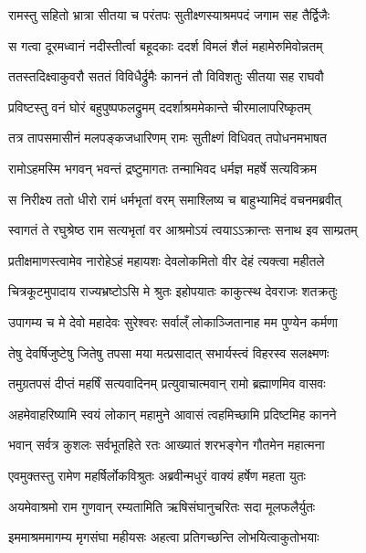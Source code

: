 
\twolineshloka
{रामस्तु सहितो भ्रात्रा सीतया च परंतपः}
{सुतीक्ष्णस्याश्रमपदं जगाम सह तैर्द्विजैः} %

\twolineshloka
{स गत्वा दूरमध्वानं नदीस्तीर्त्वा बहूदकाः}
{ददर्श विमलं शैलं महामेरुमिवोन्नतम्} %

\twolineshloka
{ततस्तदिक्ष्वाकुवरौ सततं विविधैर्द्रुमैः}
{काननं तौ विविशतुः सीतया सह राघवौ} %

\twolineshloka
{प्रविष्टस्तु वनं घोरं बहुपुष्पफलद्रुमम्}
{ददर्शाश्रममेकान्ते चीरमालापरिष्कृतम्} %

\twolineshloka
{तत्र तापसमासीनं मलपङ्कजधारिणम्}
{रामः सुतीक्ष्णं विधिवत् तपोधनमभाषत} %

\twolineshloka
{रामोऽहमस्मि भगवन् भवन्तं द्रष्टुमागतः}
{तन्माभिवद धर्मज्ञ महर्षे सत्यविक्रम} %

\twolineshloka
{स निरीक्ष्य ततो धीरो रामं धर्मभृतां वरम्}
{समाश्लिष्य च बाहुभ्यामिदं वचनमब्रवीत्} %

\twolineshloka
{स्वागतं ते रघुश्रेष्ठ राम सत्यभृतां वर}
{आश्रमोऽयं त्वयाऽऽक्रान्तः सनाथ इव साम्प्रतम्} %

\twolineshloka
{प्रतीक्षमाणस्त्वामेव नारोहेऽहं महायशः}
{देवलोकमितो वीर देहं त्यक्त्वा महीतले} %

\twolineshloka
{चित्रकूटमुपादाय राज्यभ्रष्टोऽसि मे श्रुतः}
{इहोपयातः काकुत्स्थ देवराजः शतक्रतुः} %

\twolineshloka
{उपागम्य च मे देवो महादेवः सुरेश्वरः}
{सर्वाल्ँ लोकाञ्जितानाह मम पुण्येन कर्मणा} %

\twolineshloka
{तेषु देवर्षिजुष्टेषु जितेषु तपसा मया}
{मत्प्रसादात् सभार्यस्त्वं विहरस्व सलक्ष्मणः} %

\twolineshloka
{तमुग्रतपसं दीप्तं महर्षिं सत्यवादिनम्}
{प्रत्युवाचात्मवान् रामो ब्रह्माणमिव वासवः} %

\twolineshloka
{अहमेवाहरिष्यामि स्वयं लोकान् महामुने}
{आवासं त्वहमिच्छामि प्रदिष्टमिह कानने} %

\twolineshloka
{भवान् सर्वत्र कुशलः सर्वभूतहिते रतः}
{आख्यातं शरभङ्गेन गौतमेन महात्मना} %

\twolineshloka
{एवमुक्तस्तु रामेण महर्षिर्लोकविश्रुतः}
{अब्रवीन्मधुरं वाक्यं हर्षेण महता युतः} %

\twolineshloka
{अयमेवाश्रमो राम गुणवान् रम्यतामिति}
{ऋषिसंघानुचरितः सदा मूलफलैर्युतः} %

\twolineshloka
{इममाश्रममागम्य मृगसंघा महीयसः}
{अहत्वा प्रतिगच्छन्ति लोभयित्वाकुतोभयाः} %

